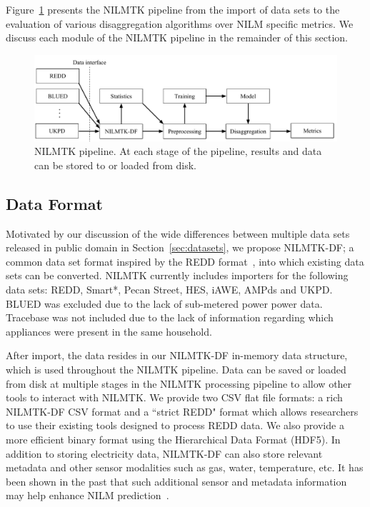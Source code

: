 \documentclass{sig-alternate}
\newcommand{\bluecolor}[1]{\textcolor{blue}{#1}}
\newcommand{\figref}[1]{Figure~\ref{#1}}
\newcommand{\secref}[1]{Section~\ref{#1}}
\begin{document}
\figref{fig:pipeline} presents the NILMTK pipeline from the import of data sets to the evaluation of various disaggregation algorithms over NILM specific metrics. We discuss each module of the NILMTK pipeline in the remainder of this section.

\begin{figure}
\centering \includegraphics[scale=0.6]{figures/pipeline.pdf}
\caption{NILMTK pipeline. At each stage of the pipeline, results and data can be stored to or loaded from disk.}
\label{fig:pipeline}
\end{figure}


\subsection{Data Format}%
\label{sec:data_format} 

\noindent
Motivated by our discussion of the wide differences between multiple data sets released in public domain in \secref{sec:datasets}, we propose NILMTK-DF; a common
data set format inspired by the REDD format~\cite{redd}, into which
existing data sets can be converted. NILMTK currently includes
importers for the following data sets: REDD, Smart*, Pecan Street, HES, iAWE, AMPds
and UKPD. BLUED was excluded due to the lack of sub-metered power power data. Tracebase was not included due to the lack of information regarding which appliances were present in the same household.

After import, the data resides in our NILMTK-DF in-memory data structure, which is used throughout the NILMTK pipeline. Data can be saved or loaded from disk at multiple stages in the NILMTK processing pipeline to allow other tools to interact with NILMTK.  We provide two CSV flat file formats: a rich NILMTK-DF CSV format and a ``strict REDD" format which allows researchers to use their existing tools designed to process REDD data.  We also provide a more efficient binary format using the Hierarchical Data Format (HDF5).  In addition to storing electricity data, NILMTK-DF can also store relevant metadata and other sensor modalities such as gas, water, temperature, etc. It has been shown in the past that such additional sensor and metadata information may help enhance NILM prediction~\cite{schoofs_2010}. 
\end{document}
